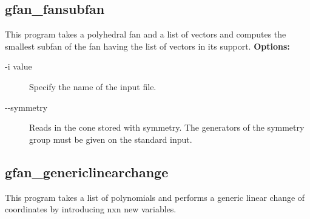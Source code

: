 {{{{{{{{{{\subsection{gfan\_fansubfan}\label{applist:_fansubfan}
This program takes a polyhedral fan and a list of vectors and computes the smallest subfan of the fan having the list of vectors in its support.
\newline
{\bf Options:}
\begin{description}
\item[-i value]Specify the name of the input file.\item[-\hspace{0.013cm}-symmetry]Reads in the cone stored with symmetry. The generators of the symmetry group must be given on the standard input.
\end{description}


{\subsection{gfan\_genericlinearchange}\label{applist:_genericlinearchange}
This program takes a list of polynomials and performs a generic linear change of coordinates by introducing nxn new variables.


}}}}}}}}}}}
